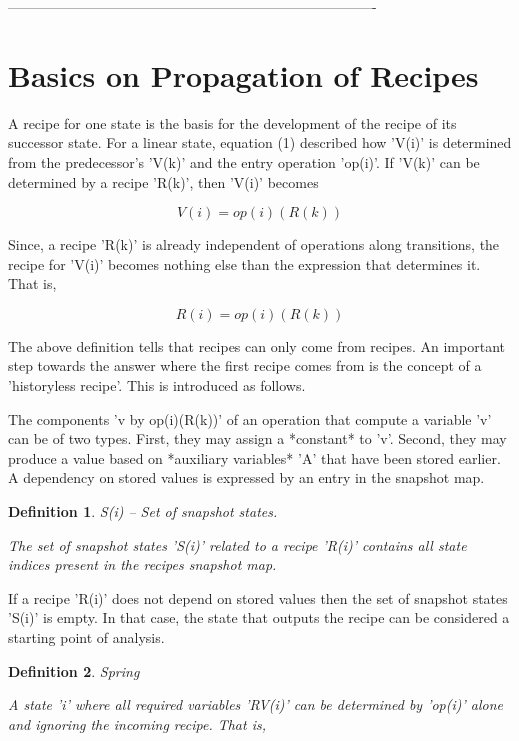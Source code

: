 \documentclass[12pt]{article}
\newtheorem{definition}{Definition}
\begin{document}
-------------------------------------------------------------------------------

\section{Basics on Propagation of Recipes}

A recipe for one state is the basis for the development of the recipe of its
successor state. For a linear state, equation (1) described how 'V(i)' is
determined from the predecessor's 'V(k)' and the entry operation 'op(i)'. If
'V(k)' can be determined by a recipe 'R(k)', then 'V(i)' becomes

\[
                     V(i) = op(i)(R(k))                                     
\]

Since, a recipe 'R(k)' is already independent of operations along transitions,
the recipe for 'V(i)' becomes nothing else than the expression that
determines it. That is,

\[
                     R(i) = { op(i)(R(k)) }                                 
\]
                 
The above definition tells that recipes can only come from recipes. An
important step towards the answer where the first recipe comes from is the
concept of a 'historyless recipe'. This is introduced as follows. 

The components 'v by op(i)(R(k))' of an operation that compute a variable 'v'
can be of two types. First, they may assign a *constant* to 'v'. Second, they may
produce a value based on *auxiliary variables* 'A' that have been stored earlier.
A dependency on stored values is expressed by an entry in the snapshot map.

\begin{definition}
S(i) -- Set of snapshot states.

The set of snapshot states 'S(i)' related to a recipe 'R(i)' contains
all state indices present in the recipes snapshot map.
\end{definition}

If a recipe 'R(i)' does not depend on stored values then the set of snapshot
states 'S(i)' is empty. In that case, the state that outputs the recipe can 
be considered a starting point of analysis.

\begin{definition}
Spring

A state 'i' where all required variables 'RV(i)' can be determined by 
'op(i)' alone and ignoring the incoming recipe. That is, 
\end{definition}
\end{document}
